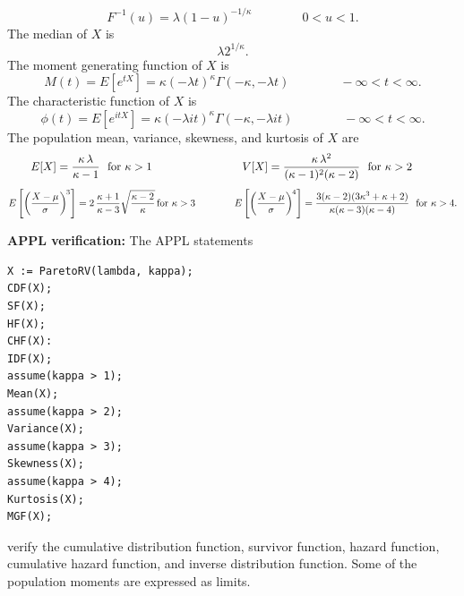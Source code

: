 \documentclass[12pt,fullpage]{article}
\begin{document}
$$
F ^ {-1}(u) = \lambda(1 - u)^{-1/\kappa} \qquad \qquad 0 < u < 1.
$$
The median of $X$ is
$$
\lambda 2^{1/\kappa}.
$$
The moment generating function of $X$ is
$$
M(t) = E\left[ e ^ {tX} \right] = \kappa (-\lambda t)^{\kappa}\Gamma(-\kappa, -\lambda t) \qquad \qquad -\infty < t < \infty.
$$
The characteristic function of $X$ is
$$
\phi(t) = E\left[ e ^ {itX} \right] =  \kappa (-\lambda it)^{\kappa}\Gamma(-\kappa, -\lambda it) \qquad \qquad -\infty < t < \infty.
$$
The population mean, variance, skewness, and kurtosis of $X$ are
$$
\qquad E[X] = \frac{\kappa \, \lambda} {\kappa - 1}\ \  {\rm for}\ \kappa > 1 \qquad \qquad \qquad \qquad
V[X] = \frac{\kappa \, \lambda ^ 2}{(\kappa - 1) ^ 2(\kappa - 2)}\ \ {\rm for}\ \kappa >2 \qquad \qquad
$$
$$
E\left[ \left( \frac{X - \mu}{\sigma} \right) ^ {\kern -0.08 em 3} \right] = 2 \, \frac{\kappa+1}{\kappa - 3} \sqrt{\frac{\kappa - 2}{\kappa}}\, {\rm for}\ \kappa >3 \qquad \qquad 
E\left[ \left( \frac{X - \mu}{\sigma} \right) ^ {\kern -0.08 em 4} \right] =  \frac{3(\kappa - 2)(3\kappa^3 + \kappa + 2)}{\kappa(\kappa-3)(\kappa-4)}\ \ {\rm for}\ \kappa>4.
$$

\vspace{0.1in}

\noindent
{\bf APPL verification:}
The APPL statements
\begin{verbatim}
X := ParetoRV(lambda, kappa);
CDF(X);
SF(X);
HF(X);
CHF(X):
IDF(X);
assume(kappa > 1);
Mean(X);
assume(kappa > 2);
Variance(X);
assume(kappa > 3);
Skewness(X);
assume(kappa > 4);
Kurtosis(X);
MGF(X);
\end{verbatim}
verify the cumulative distribution function, survivor function, hazard function, cumulative hazard function, and inverse distribution function.
Some of the population moments are expressed as limits. 
\end{document}
